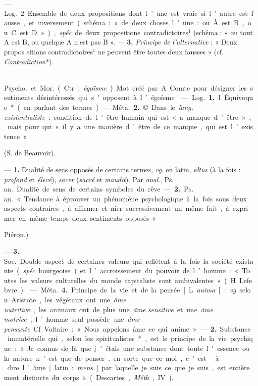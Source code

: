 \begin{itemize}[leftmargin=1cm, label=, itemsep=1pt]
{{— \si{Log.} 2 Ensemble de deux
propositions dont l’une est vraie si
l’autre est fausse, et inversement
(schéma : « de deux choses l’une :
ou À est B, ou C est D »), {\it spéc}. de
deux propositions contradictoires$^1$
(schéma : « ou tout A est B, ou
quelque A n’est pas B »}. — {\bf 3.} {\it Principe de l'alternative} : « Deux propos
sitions contradictoires$^1$ ne peuvent
être toutes deux fausses » (cf. {\it Contradiction}*).

 — \si{Psycho.} et \si{Mor.} (Ctr. :
{\it égoïsme}). Mot créé par A. Comte
pour désigner les sentiments désintéressés qui s'opposent à l’égoïsme.

 — \si{Log.} {\bf 1.} I Équivoque* (en
parlant des termes).

— \si{Méta.} {\bf 2.} © Dans le {\it lang. existentialiste} : condition de l'être humain
qui est «a manque d’être », mais pour
qui «il y a une manière d’être de
ce manque, qui est l'existence »
{(S. de Beauvoir).

 — {\bf 1.} Dualité de sens
opposés de certains termes, {\it vg}. en
latin, {\it altus} (à la fois : {\it profond} et
{\it élevé}), {\it sacer} ({\it sacré} et {\it maudit}). Par
{\it anal}., \si{Ps. an.} Dualité de sens de
certains symboles du rêve.

— {\bf 2.} \si{Ps. an.} « Tendance à
éprouver un phénomène psychologique à la fois sous deux aspects
contraires, à affirmer et nier successivement un même fait, à exprimer en
même temps deux sentiments opposés » {Piéron.)

— {\bf 3.} \si{Soc.} Double aspect de
certaines valeurs qui reflètent à la
fois la société existante ({\it spéc}. bourgeoise) et l’accroissement du pouvoir
de l’homme : « Toutes les valeurs
culturelles du monde capitaliste sont
ambivalentes » (H. Lefebvre).

 — \si{Méta.} {\bf 4.} Principe de la vie et
de la pensée [L. {\it anima}] : {\it vg}. selon
Aristote, les végétaux ont une {\it âme
nutritive}, les animaux ont de plus
une {\it âme sensitive} et une {\it âme motrice},
l’homme seul possède une {\it âme pensante}. Cf. Voltaire : « Nous appelons
âme ce qui anime ». — {\bf 2.} Substance
immatérielle qui, selon les spiritualistes*,
est le principe de la vie psychique : «Je connus de là que j'étais une
substance dont toute l'essence ou la
nature n’est que de penser..., en sorte
que ce moi, c'est-à-dire l’âme [latin :
{\it mens}] par laquelle je suis ce que
je suis, est entièrement distincte du
corps » (Descartes, {\it Méth}., IV).

}}}
\end{itemize}
